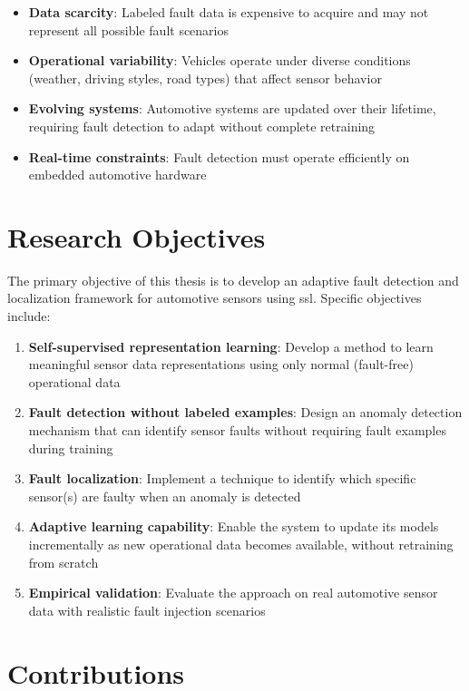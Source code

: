 \begin{itemize}
    \item \textbf{Data scarcity}: Labeled fault data is expensive to acquire and may not represent all possible fault scenarios
    \item \textbf{Operational variability}: Vehicles operate under diverse conditions (weather, driving styles, road types) that affect sensor behavior
    \item \textbf{Evolving systems}: Automotive systems are updated over their lifetime, requiring fault detection to adapt without complete retraining
    \item \textbf{Real-time constraints}: Fault detection must operate efficiently on embedded automotive hardware
\end{itemize}

\section{Research Objectives}

The primary objective of this thesis is to develop an adaptive fault detection and localization framework for automotive sensors using \gls{ssl}. Specific objectives include:

\begin{enumerate}
    \item \textbf{Self-supervised representation learning}: Develop a method to learn meaningful sensor data representations using only normal (fault-free) operational data
    \item \textbf{Fault detection without labeled examples}: Design an anomaly detection mechanism that can identify sensor faults without requiring fault examples during training
    \item \textbf{Fault localization}: Implement a technique to identify which specific sensor(s) are faulty when an anomaly is detected
    \item \textbf{Adaptive learning capability}: Enable the system to update its models incrementally as new operational data becomes available, without retraining from scratch
    \item \textbf{Empirical validation}: Evaluate the approach on real automotive sensor data with realistic fault injection scenarios
\end{enumerate}

\section{Contributions}

